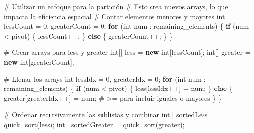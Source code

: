 \documentclass[
  spanish,
  letterpaper,
  DIV=11,
  numbers=noendperiod]{scrreprt}
\newenvironment{Shaded}{\begin{snugshade}}{\end{snugshade}}
\newcommand{\ControlFlowTok}[1]{\textcolor[rgb]{0.00,0.23,0.31}{\textbf{#1}}}
\newcommand{\DataTypeTok}[1]{\textcolor[rgb]{0.68,0.00,0.00}{#1}}
\newcommand{\DecValTok}[1]{\textcolor[rgb]{0.68,0.00,0.00}{#1}}
\newcommand{\FunctionTok}[1]{\textcolor[rgb]{0.28,0.35,0.67}{#1}}
\newcommand{\KeywordTok}[1]{\textcolor[rgb]{0.00,0.23,0.31}{\textbf{#1}}}
\newcommand{\NormalTok}[1]{\textcolor[rgb]{0.00,0.23,0.31}{#1}}
\newcommand{\OperatorTok}[1]{\textcolor[rgb]{0.37,0.37,0.37}{#1}}
\begin{document}
\begin{Shaded}
\begin{Highlighting}[]
\NormalTok{        \# Utilizar un enfoque para la partición}
\NormalTok{        \# Esto crea nuevos arrays}\OperatorTok{,}\NormalTok{ lo que impacta la eficiencia espacial}
\NormalTok{        \# Contar elementos menores y mayores}
        \DataTypeTok{int}\NormalTok{ lessCount }\OperatorTok{=} \DecValTok{0}\OperatorTok{,}\NormalTok{ greaterCount }\OperatorTok{=} \DecValTok{0}\OperatorTok{;}
        \ControlFlowTok{for} \OperatorTok{(}\DataTypeTok{int}\NormalTok{ num }\OperatorTok{:}\NormalTok{ remaining\_elements}\OperatorTok{)} \OperatorTok{\{}
            \ControlFlowTok{if} \OperatorTok{(}\NormalTok{num }\OperatorTok{\textless{}}\NormalTok{ pivot}\OperatorTok{)} \OperatorTok{\{}
\NormalTok{                lessCount}\OperatorTok{++;}
            \OperatorTok{\}} \ControlFlowTok{else} \OperatorTok{\{}
\NormalTok{                greaterCount}\OperatorTok{++;}
            \OperatorTok{\}}
        \OperatorTok{\}}
        
\NormalTok{        \# Crear arrays para less y greater}
        \DataTypeTok{int}\OperatorTok{[]}\NormalTok{ less }\OperatorTok{=} \KeywordTok{new} \DataTypeTok{int}\OperatorTok{[}\NormalTok{lessCount}\OperatorTok{];}
        \DataTypeTok{int}\OperatorTok{[]}\NormalTok{ greater }\OperatorTok{=} \KeywordTok{new} \DataTypeTok{int}\OperatorTok{[}\NormalTok{greaterCount}\OperatorTok{];}
        
\NormalTok{        \# Llenar los arrays}
        \DataTypeTok{int}\NormalTok{ lessIdx }\OperatorTok{=} \DecValTok{0}\OperatorTok{,}\NormalTok{ greaterIdx }\OperatorTok{=} \DecValTok{0}\OperatorTok{;}
        \ControlFlowTok{for} \OperatorTok{(}\DataTypeTok{int}\NormalTok{ num }\OperatorTok{:}\NormalTok{ remaining\_elements}\OperatorTok{)} \OperatorTok{\{}
            \ControlFlowTok{if} \OperatorTok{(}\NormalTok{num }\OperatorTok{\textless{}}\NormalTok{ pivot}\OperatorTok{)} \OperatorTok{\{}
\NormalTok{                less}\OperatorTok{[}\NormalTok{lessIdx}\OperatorTok{++]} \OperatorTok{=}\NormalTok{ num}\OperatorTok{;}
            \OperatorTok{\}} \ControlFlowTok{else} \OperatorTok{\{}
\NormalTok{                greater}\OperatorTok{[}\NormalTok{greaterIdx}\OperatorTok{++]} \OperatorTok{=}\NormalTok{ num}\OperatorTok{;}\NormalTok{ \# }\OperatorTok{\textgreater{}=}\NormalTok{ para incluir iguales o mayores}
            \OperatorTok{\}}
        \OperatorTok{\}}
        
\NormalTok{        \# Ordenar recursivamente las sublistas y combinar}
        \DataTypeTok{int}\OperatorTok{[]}\NormalTok{ sortedLess }\OperatorTok{=} \FunctionTok{quick\_sort}\OperatorTok{(}\NormalTok{less}\OperatorTok{);}
        \DataTypeTok{int}\OperatorTok{[]}\NormalTok{ sortedGreater }\OperatorTok{=} \FunctionTok{quick\_sort}\OperatorTok{(}\NormalTok{greater}\OperatorTok{);}
        

\end{Highlighting}
\end{Shaded}
\end{document}
